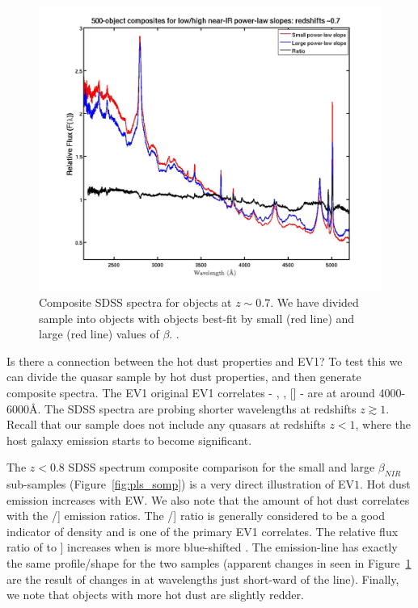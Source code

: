 \begin{figure}
  \centering
  \includegraphics[width=\textwidth]{figures/chapter05/z07_pls_comps.jpg}
  \caption[{Composite SDSS spectra for objects at $z\sim0.7$.}]{Composite SDSS spectra for objects at $z\sim0.7$. We have divided sample into objects with objects best-fit by small (red line) and large (red line) values of $\beta$. .}
  \label{fig:pls_comp}
\end{figure}

Is there a connection between the hot dust properties and EV1? 
To test this we can divide the quasar sample by hot dust properties, and then generate composite spectra. 
The EV1 original EV1 correlates - , \hb, [] - are at around 4000-6000\AA. 
The SDSS spectra are probing shorter wavelengths at redshifts $z\gtrsim1$.
Recall that our sample does not include any quasars at redshifts $z<1$, where the host galaxy emission starts to become significant. 

The $z < 0.8$ SDSS spectrum composite comparison for the small and large $\beta_{NIR}$ sub-samples (Figure~\ref{fig:pls_somp}) is a very direct illustration of EV$1$. 
Hot dust emission increases with  EW. 
We also note that the amount of hot dust correlates with the /] emission ratios. 
The /] ratio is generally considered to be a good indicator of density and is one of the primary EV1 correlates. 
The relative flux ratio of  to ] increases when  is more blue-shifted \citep{richards11}. 
The  emission-line has exactly the same profile/shape for the two samples (apparent changes in  seen in Figure~\ref{fig:pls_comp} are the result of changes in  at wavelengths just short-ward of the line). 
Finally, we note that objects with more hot dust are slightly redder.

